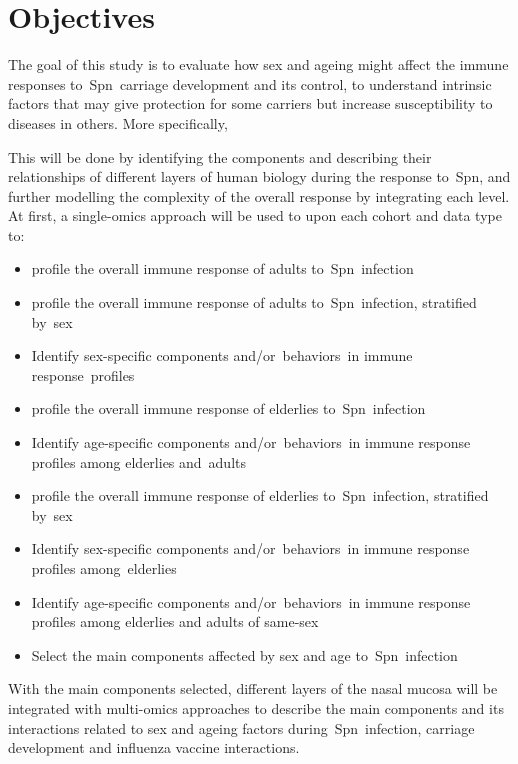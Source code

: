 \documentclass[
]{book}
\begin{document}
\hypertarget{objectives}{%
\chapter{Objectives}\label{objectives}}

The goal of this study is to evaluate how sex and ageing might affect the immune responses to~Spn~carriage development and its control, to understand intrinsic factors that may give protection for some carriers but increase susceptibility to diseases in others. More specifically,

This will be done by identifying the components and describing their relationships of different layers of human biology during the response to~Spn, and further modelling the complexity of the overall response by integrating each level. At first, a single-omics approach will be used to upon each cohort and data type to:

\begin{itemize}
\item
  profile the overall immune response of adults to~Spn~infection
\item
  profile the overall immune response of adults to~Spn~infection, stratified by~sex
\item
  Identify sex-specific components and/or~behaviors~in immune response~profiles
\item
  profile the overall immune response of elderlies to~Spn~infection
\item
  Identify age-specific components and/or~behaviors~in immune response profiles among elderlies and~adults
\item
  profile the overall immune response of elderlies to~Spn~infection, stratified by~sex
\item
  Identify sex-specific components and/or~behaviors~in immune response profiles among~elderlies
\item
  Identify age-specific components and/or~behaviors~in immune response profiles among elderlies and adults of same-sex
\item
  Select the main components affected by sex and age to~Spn~infection
\end{itemize}

With the main components selected, different layers of the nasal mucosa will be integrated with multi-omics approaches to describe the main components and its interactions related to sex and ageing factors during~Spn~infection, carriage development and influenza vaccine interactions.
\end{document}
